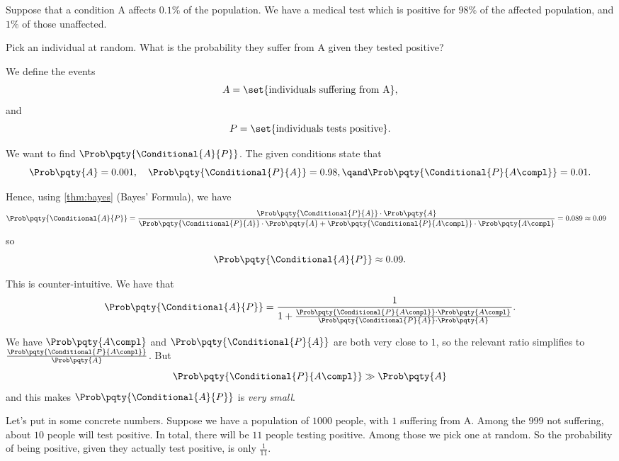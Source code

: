 \begin{example}
    \label{ex:false-positives}%
    Suppose that a condition A affects \(0.1\%\) of the population. We have a medical test which is positive for \(98\%\) of the affected population, and \(1\%\) of those unaffected.

    Pick an individual at random. What is the probability they suffer from A given they tested positive?

    We define the events
    \[
        A = \set{\text{individuals suffering from A}},
    \]
    and
    \[
        P = \set{\text{individuals tests positive}}.
    \]

    We want to find \(\Prob\pqty{\Conditional{A}{P}}\). The given conditions state that
    \[
        \Prob\pqty{A} = 0.001, \quad \Prob\pqty{\Conditional{P}{A}} = 0.98, \qand \Prob\pqty{\Conditional{P}{A\compl}} = 0.01.
    \]

    Hence, using \autoref{thm:bayes} (Bayes' Formula), we have
    \begin{align*}
        \Prob\pqty{\Conditional{A}{P}} &= \frac{\Prob\pqty{\Conditional{P}{A}} \cdot \Prob\pqty{A}}{\Prob\pqty{\Conditional{P}{A}} \cdot \Prob\pqty{A} + \Prob\pqty{\Conditional{P}{A\compl}} \cdot \Prob\pqty{A\compl}} = 0.089 \approx 0.09
    \end{align*}
    so
    \[
        \Prob\pqty{\Conditional{A}{P}} \approx 0.09.
    \]

    This is counter-intuitive. We have that
    \[
        \Prob\pqty{\Conditional{A}{P}} = \frac{1}{1 + \frac{\Prob\pqty{\Conditional{P}{A\compl}} \cdot \Prob\pqty{A\compl}}{\Prob\pqty{\Conditional{P}{A}} \cdot \Prob\pqty{A}}}.
    \]

    We have \(\Prob\pqty{A\compl}\) and \(\Prob\pqty{\Conditional{P}{A}}\) are both very close to \(1\), so the relevant ratio simplifies to \(\frac{\Prob\pqty{\Conditional{P}{A\compl}}}{\Prob\pqty{A}}\). But
    \[
        \Prob\pqty{\Conditional{P}{A\compl}} \gg \Prob\pqty{A}
    \]
    and this makes \(\Prob\pqty{\Conditional{A}{P}}\) is \emph{very small}.

    Let's put in some concrete numbers. Suppose we have a population of \(1000\) people, with \(1\) suffering from A. Among the \(999\) not suffering, about \(10\) people will test positive. In total, there will be \(11\) people testing positive. Among those we pick one at random. So the probability of being positive, given they actually test positive, is only \(\frac{1}{11}\).
\end{example}

